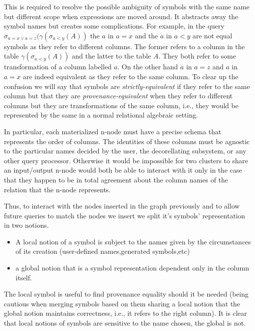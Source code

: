 This is required to resolve the possible ambiguity of symbols with the same name but different scope
when expressions are moved around. It abstracts away the symbol
names but creates some complications. For example, in the query
\(\sigma_{a=x \lor a=z}(\gamma(\sigma_{a<y}(A))\) the \(a\) in \(a=x\)
and the \(a\) in \(a < y\) are not equal symbols as they refer to
different columns. The former refers to a column in the table
\(\gamma(\sigma_{a<y}(A))\) and the latter to the table \(A\). They
both refer to some transformation of a column labelled \(a\). On the other hand \(a\) in \(a=z\) and \(a\) in \(a=x\) are
indeed equivalent as they refer to the same column. To clear up the
confusion we will say that symbols are \emph{strictly-equivalent} if
they refer to the same column but that they are
\emph{provenance-equivalent} when they refer to different columns but
they are transformations of the same column, i.e., they would be
represented by the same in a normal relational
algebraic setting. 

In particular, each materialized n-node must have a precise
schema that represents the order of columns. The identities of these
columns must be agnostic to the particular names decided by the user,
the decorellating subsystem, or any other query processor. Otherwise it
would be impossible for two clusters to share an input/output n-node
would both be able to interact with it only in the case that they
happen to be in total agreement about the column names of the relation
that the n-node represents.

Thus, to interact with the nodes inserted in the graph
previously and to allow future queries to match the nodes we insert we
split it's symbols' representation in two notions.

\begin{itemize}
\item A local notion of a symbol is subject to the names given by the
  circumstances of its creation (user-defined names,generated
  symbols,etc)
\item a global notion that is a symbol representation dependent only in
  the column itself.
\end{itemize}

The local symbol is useful to find provenance equality
should it be needed (being cautious when merging symbols based
on them sharing a local notion that the global notion maintains
correctness, i.e., it refers to the right column). It is clear that
local notions of symbols are sensitive to the name chosen, the
global is not.


